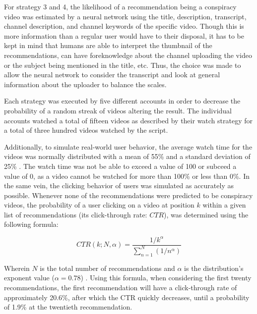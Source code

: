 \documentclass[../main.tex]{subfiles}
\begin{document}
For strategy 3 and 4, the likelihood of a recommendation being a conspiracy video was estimated by a 
neural network using the title, description, transcript, channel description, and channel keywords of the 
specific video. Though this is more information than a regular user would have to their disposal, it has to 
be kept in mind that humans are able to interpret the thumbnail of the recommendations, can have 
foreknowledge about the channel uploading the video or the subject being mentioned in the title, etc. Thus, 
the choice was made to allow the neural network to consider the transcript and look at general information 
about the uploader to balance the scales. 

Each strategy was executed by five different accounts in order to decrease the probability of a 
random streak of videos altering the result. The individual accounts watched a total of fifteen
videos as described by their watch strategy for a total of three hundred videos watched by the script. 

Additionally, to simulate real-world user behavior, the average watch time for the videos was normally
distributed with a mean of 55\% and a standard deviation of 25\% \citep{park2016data, lang_2018}. The 
watch time was not be able to exceed a value of 100 or subceed a value of 0, as a video cannot be watched 
for more than 100\% or less than 0\%. In the same vein, the clicking behavior of users was simulated as 
accurately as possible. Whenever none of the recommendations were predicted to be conspiracy videos, the 
probability of a user clicking on a video at position $k$ within a given list of recommendations (its 
click-through rate: $CTR$), was determined using the following formula:

\begin{equation}
CTR(k; N, \alpha) = \frac{1/k^\alpha}{\sum_{n=1}^{N} (1/n^\alpha)}
\end{equation}

Wherein $N$ is the total number of recommendations and $\alpha$ is the distribution's exponent value 
($\alpha = 0.78$) \citep{zhou2010impact}. Using this formula, when considering the first twenty 
recommendations, the first recommendation will have a click-through rate of approximately 20.6\%, after 
which the CTR quickly decreases, until a probability of 1.9\% at the twentieth recommendation. 
\end{document}
